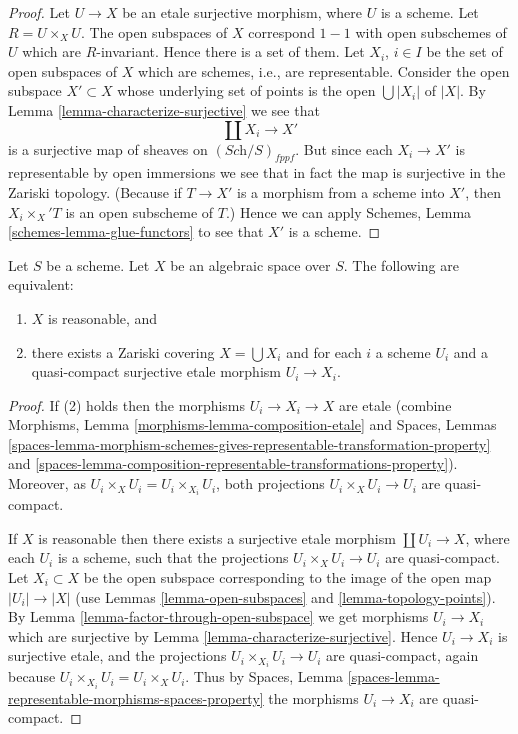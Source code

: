 \begin{proof}
Let $U \to X$ be an etale surjective morphism, where $U$ is a scheme.
Let $R = U \times_X U$. The open subspaces of $X$ correspond $1 - 1$
with open subschemes of $U$ which are $R$-invariant. Hence there is a
set of them. Let $X_i$, $i \in I$ be the set of open subspaces
of $X$ which are schemes, i.e., are representable. Consider the
open subspace $X' \subset X$ whose underlying set of points is
the open $\bigcup |X_i|$ of $|X|$. By
Lemma \ref{lemma-characterize-surjective}
we see that
$$
\coprod X_i \longrightarrow X'
$$
is a surjective map of sheaves on $(\textit{Sch}/S)_{fppf}$.
But since each $X_i \to X'$ is representable by open immersions
we see that in fact the map is surjective in the Zariski
topology. (Because if $T \to X'$ is a morphism from a scheme
into $X'$, then $X_i \times_X' T$ is an open subscheme of $T$.)
Hence we can apply
Schemes, Lemma \ref{schemes-lemma-glue-functors}
to see that $X'$ is a scheme.
\end{proof}

\begin{lemma}
\label{lemma-characterize-reasonable}
Let $S$ be a scheme.
Let $X$ be an algebraic space over $S$.
The following are equivalent:
\begin{enumerate}
\item $X$ is reasonable, and
\item there exists a Zariski covering $X = \bigcup X_i$ and for
each $i$ a scheme $U_i$ and a quasi-compact surjective etale
morphism $U_i \to X_i$.
\end{enumerate}
\end{lemma}

\begin{proof}
If (2) holds then the morphisms $U_i \to X_i \to X$ are etale (combine
Morphisms, Lemma \ref{morphisms-lemma-composition-etale}
and
Spaces, Lemmas
\ref{spaces-lemma-morphism-schemes-gives-representable-transformation-property}
and
\ref{spaces-lemma-composition-representable-transformations-property}).
Moreover, as $U_i \times_X U_i = U_i \times_{X_i} U_i$,
both projections $U_i \times_X U_i \to U_i$ are quasi-compact.

\medskip\noindent
If $X$ is reasonable then there exists a surjective etale morphism
$\coprod U_i \to X$, where each $U_i$ is a scheme, such that
the projections $U_i \times_X U_i \to U_i$ are quasi-compact.
Let $X_i \subset X$ be the open subspace corresponding to the image
of the open map $|U_i| \to |X|$ (use
Lemmas \ref{lemma-open-subspaces} and \ref{lemma-topology-points}).
By Lemma \ref{lemma-factor-through-open-subspace}
we get morphisms $U_i \to X_i$ which are
surjective by Lemma \ref{lemma-characterize-surjective}.
Hence $U_i \to X_i$ is surjective etale, and the projections
$U_i \times_{X_i} U_i \to U_i$ are quasi-compact, again because
$U_i \times_{X_i} U_i = U_i \times_X U_i$. Thus by
Spaces, Lemma \ref{spaces-lemma-representable-morphisms-spaces-property}
the morphisms $U_i \to X_i$ are quasi-compact.
\end{proof}

